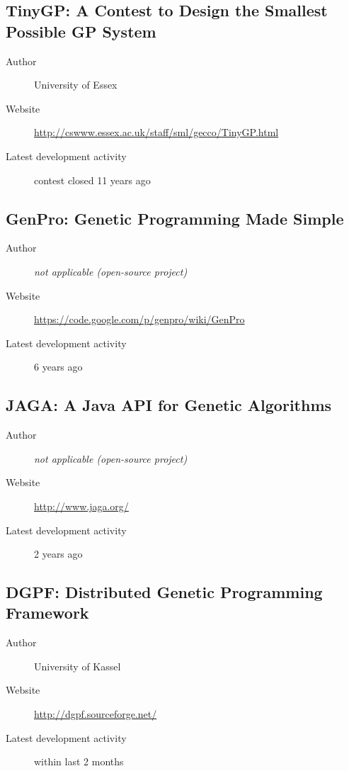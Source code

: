 \subsection*{TinyGP: A Contest to Design the Smallest Possible GP System}
\begin{description}
    \item[Author] University of Essex
    \item[Website] \url{http://cswww.essex.ac.uk/staff/sml/gecco/TinyGP.html}
    \item[Latest development activity] contest closed 11 years ago
\end{description}


\subsection*{GenPro: Genetic Programming Made Simple}
\begin{description}
    \item[Author] \textit{not applicable (open-source project)}
    \item[Website] \url{https://code.google.com/p/genpro/wiki/GenPro}
    \item[Latest development activity] 6 years ago
\end{description}


\subsection*{JAGA: A Java API for Genetic Algorithms}
\begin{description}
    \item[Author] \textit{not applicable (open-source project)}
    \item[Website] \url{http://www.jaga.org/}
    \item[Latest development activity] 2 years ago
\end{description}


\subsection*{DGPF: Distributed Genetic Programming Framework}
\begin{description}
    \item[Author] University of Kassel
    \item[Website] \url{http://dgpf.sourceforge.net/}
    \item[Latest development activity] within last 2 months
\end{description}


